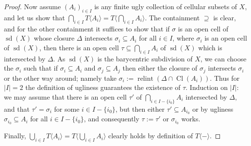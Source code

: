 \documentclass[a4paper,11pt,reqno, english]{amsart}
\theoremstyle{definition}
\theoremstyle{remark}
\DeclareMathOperator{\relint}{\mathrm{relint}}
\begin{document}
\begin{proof}
    Now assume $(A_i)_{i\in I}$ is any finite ugly collection of cellular subsets of $X$, and let us show that $\bigcap_{i\in I}T\langle A_i\rangle=T\langle\bigcap_{i\in I}A_i\rangle$. The containment $\supseteq$ is clear, and for the other containment it suffices to show that if $\sigma$ is an open cell of $\operatorname{sd}(X)$ whose closure $\Delta$ intersects $\sigma_i\subseteq A_i$ for all $i\in I$, where $\sigma_i$ is an open cell of $\operatorname{sd}(X)$, then there is an open cell $\tau\subseteq\bigcap_{i\in I}A_i$ of $\operatorname{sd}(X)$ which is intersected by $\Delta$. As $\operatorname{sd}(X)$ is the barycentric subdivision of $X$, we can choose the $\sigma_i$ such that if $\sigma_i\subseteq A_i$ and $\sigma_j\subseteq A_j$ then either the closure of $\sigma_j$ intersects $\sigma_i$ or the other way around; namely take $\sigma_i:=\relint(\Delta\cap\operatorname{Cl}(A_i))$. Thus for $|I|=2$ the definition of ugliness guarantees the existence of $\tau$. Induction on $|I|$: we may assume that there is an open cell $\tau'$ of $\bigcap_{i\in I-\{i_0\}}A_i$ intersected by $\Delta$, and that $\tau'=\sigma_i$ for some $i\in I-\{i_0\}$, but then either $\tau'\subseteq A_{i_0}$ or by ugliness $\sigma_{i_0}\subseteq A_i$ for all $i\in I-\{i_0\}$, and consequently $\tau:=\tau'$ or $\sigma_{i_0}$ works.

    Finally, $\bigcup_{i\in I}T\langle A_i\rangle=T\langle\bigcup_{i\in I}A_i\rangle$ clearly holds by definition of $T\langle -\rangle$.
\end{proof}
\end{document}
